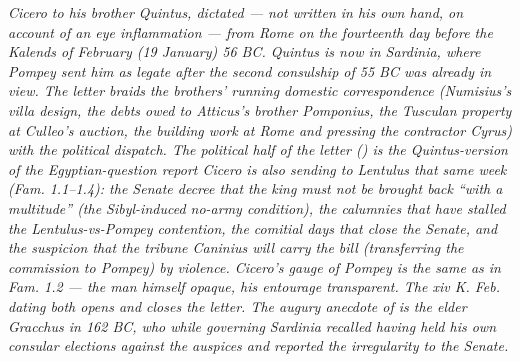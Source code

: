 
\textit{Cicero to his brother Quintus, dictated --- not written
in his own hand, on account of an eye inflammation --- from
Rome on the fourteenth day before the Kalends of February
(19 January) 56 BC. Quintus is now in Sardinia, where Pompey
sent him as legate after the second consulship of 55 BC was
already in view. The letter braids the brothers' running
domestic correspondence (Numisius's villa design, the debts
owed to Atticus's brother Pomponius, the Tusculan property at
Culleo's auction, the building work at Rome and pressing the
contractor Cyrus) with the political dispatch. The political
half of the letter () is the Quintus-version of
the Egyptian-question report Cicero is also sending to Lentulus
that same week (Fam. 1.1--1.4): the Senate decree that the king
must not be brought back ``with a multitude'' (the Sibyl-induced
no-army condition), the calumnies that have stalled the
Lentulus-vs-Pompey contention, the comitial days that close
the Senate, and the suspicion that the tribune Caninius will
carry the bill (transferring the commission to Pompey) by
violence. Cicero's gauge of Pompey is the same as in Fam. 1.2
--- the man himself opaque, his entourage transparent. The
\textit{xiv K. Feb.} dating both opens and closes the letter.
The augury anecdote of  is the elder Gracchus
in 162 BC, who while governing Sardinia recalled having held
his own consular elections against the auspices and reported
the irregularity to the Senate.}
